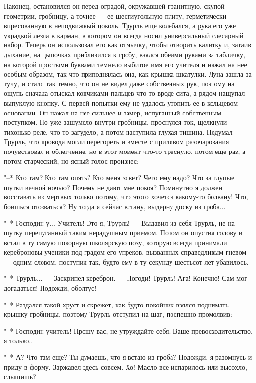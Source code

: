 Наконец, остановился он перед оградой, окружавшей
гранитную, скупой геометрии, гробницу, а точнее --- ее
шестиугольную плиту, герметически впресованную в неподвижный
цоколь. Трурль еще колебался, а рука его уже украдкой лезла
в карман, в котором он всегда носил универсальный слесарный
набор. Теперь он использовал его как отмычку, чтобы отворить
калитку и, затаив дыхание, на цыпочках приблизился к гробу,
взялся обеими руками за табличку, на которой простыми
буквами темнело выбитое имя его учителя и нажал на нее
особым образом, так что приподнялась она, как крышка
шкатулки. Луна зашла за тучу, и стало так темно, что он не
видел даже собственных рук, поэтому на ощупь сначала отыскал
кончиками пальцев что-то вроде сита, а рядом нащупал
выпуклую кнопку. С первой попытки ему не удалось утопить ее
в кольцевом основании. Он нажал на нее сильнее и замер,
испуганный собственным поступком. Но уже зашумело внутри
гробницы, проснулся ток, щелкнули тихонько реле, что-то
загудело, а потом наступила глухая тишина. Подумал Трурль,
что провода могли перегореть и вместе с приливом
разочарования почувствовал и облегчение, но в этот момент
что-то треснуло, потом еще раз, а потом старческий, но ясный
голос произнес:

"--* Кто там? Кто там опять? Кто меня зовет? Чего ему надо?
Что за глупые шутки вечной ночью? Почему не дают мне покоя?
Поминутно я должен восставать из мертвых только потому, что
этого хочется какому-то болвану! Что, боишься отозваться? Ну
тогда я сейчас встану, выдерну доску из гроба...

"--* Господин у... Учитель! Это я, Трурль! --- Выдавил из
себя Трурль, не на шутку перепуганный таким нерадушным
приемом. Потом он опустил голову и встал в ту самую покорную
школярскую позу, которую всегда принимали кереброновы
ученики под градом его упреков, вызванных справедливым
гневом --- одним словом, поступил так, будто ему в ту секунду
шестьсот лет убавилось.

"--* Трурль... --- Заскрипел кереброн. --- Погоди! Трурль!
Ага! Конечно! Сам мог догадаться! Подожди, оболтус!

"--* Раздался такой хруст и скрежет, как будто покойник
взялся поднимать крышку гробницы, поэтому Трурль отступил на
шаг, поспешно промолвив:

"--* Господин учитель! Прошу вас, не утруждайте себя. Ваше
превосходительство, я только..

"--* А? Что там еще? Ты думаешь, что я встаю из гроба?
Подожди, я разомнусь и приду в форму. Заржавел здесь совсем.
Хо! Масло все испарилось или высохло, слышишь?

